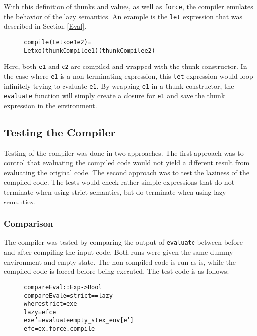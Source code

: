 With this definition of thunks and values, as well as \texttt{force}, the
compiler emulates the behavior of the lazy semantics. An example is the
\texttt{let} expression that was described in Section \ref{Eval}.

\begin{figure}[!ht]
\begin{alltt}
compile (Let xo e1 e2) =
  Let xo (thunkCompile e1) (thunkCompile e2)
\end{alltt}
\end{figure}

\noindent Here, both \texttt{e1} and \texttt{e2} are compiled and wrapped with the thunk
constructor. In the case where \texttt{e1} is a non-terminating expression,
this \texttt{let} expression would loop infinitely trying to evaluate
\texttt{e1}. By wrapping \texttt{e1} in a thunk constructor, the
\texttt{evaluate} function will simply create a closure for \texttt{e1} and save
the thunk expression in the environment.

\subsection{Testing the Compiler}

Testing of the compiler was done in two approaches. The first approach was to
control that evaluating the compiled code would not yield a different result
from evaluating the original code. The second approach was to test the laziness
of the compiled code. The tests would check rather simple expressions that do
not terminate when using strict semantics, but do terminate when using lazy
semantics.


\subsubsection{Comparison}

The compiler was tested by comparing the output of \texttt{evaluate} between
before and after compiling the input code. Both runs were given the same
dummy environment and empty state. The non-compiled code is run as is, while
the compiled code is forced before being executed.
The test code is as follows:

\begin{figure}[!ht]
\begin{alltt}
compareEval :: Exp -> Bool
compareEval e = strict == lazy
  where strict = ex e
        lazy   = efc e
        ex e'  = evaluate empty_st ex_env [e']
        efc    = ex . force . compile
\end{alltt}
\end{figure}

